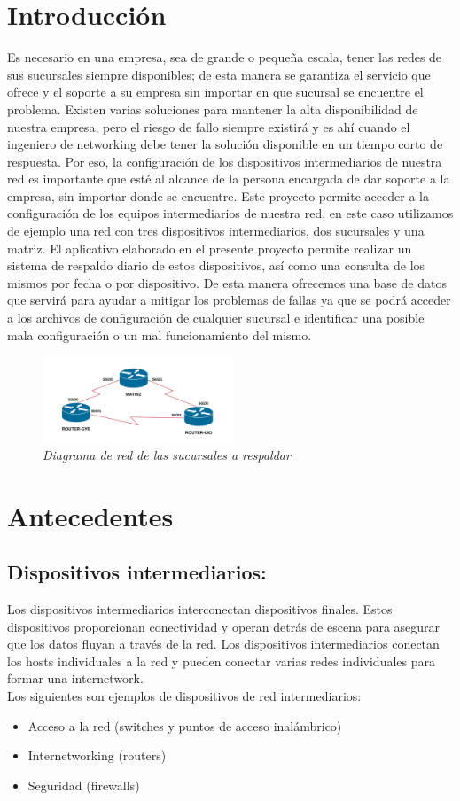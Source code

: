 \documentclass[conference]{IEEEtran}
\begin{document}
\section{Introducción}\label{sec:int}
Es necesario en una empresa, sea de grande o pequeña escala, tener las redes de sus sucursales siempre disponibles; de esta manera se garantiza el servicio que ofrece y el soporte a su empresa sin importar en que sucursal se encuentre el problema. Existen varias soluciones para mantener la alta disponibilidad de nuestra empresa, pero el riesgo de fallo siempre existirá y es ahí cuando el ingeniero de networking debe tener la solución disponible en un tiempo corto de respuesta. Por eso, la configuración de los dispositivos intermediarios de nuestra red es importante que esté al alcance de la persona encargada de dar soporte a la empresa, sin importar donde se encuentre. Este proyecto permite acceder a la configuración de los equipos intermediarios de nuestra red, en este caso utilizamos de ejemplo una red con tres dispositivos intermediarios, dos sucursales y una matriz. El aplicativo elaborado en el presente proyecto permite realizar un sistema de respaldo diario de estos dispositivos, así como una consulta de los mismos por fecha o por dispositivo. De esta manera ofrecemos una base de datos que servirá para ayudar a mitigar los problemas de fallas ya que se podrá acceder a los archivos de configuración de cualquier sucursal e identificar una posible mala configuración o un mal funcionamiento del mismo.
\begin{figure}[h]
	\centerline{\includegraphics[width=0.51\textwidth]{img/int01.png}}
	\caption{\textit{Diagrama de red de las sucursales a respaldar}}
	\label{fig:ant00}
\end{figure}
\section{Antecedentes}\label{sec:ant}
\subsection{\textbf{ Dispositivos intermediarios:}}
Los dispositivos intermediarios interconectan dispositivos finales. Estos dispositivos proporcionan conectividad y operan detrás de escena para asegurar que los datos fluyan a través de la red. Los dispositivos intermediarios conectan los hosts individuales a la red y pueden conectar varias redes individuales para formar una internetwork.\\
Los siguientes son ejemplos de dispositivos de red intermediarios:
\begin{itemize}
\item Acceso a la red (switches y puntos de acceso inalámbrico)
\item Internetworking (routers)
\item Seguridad (firewalls)
\end{itemize}
\end{document}
